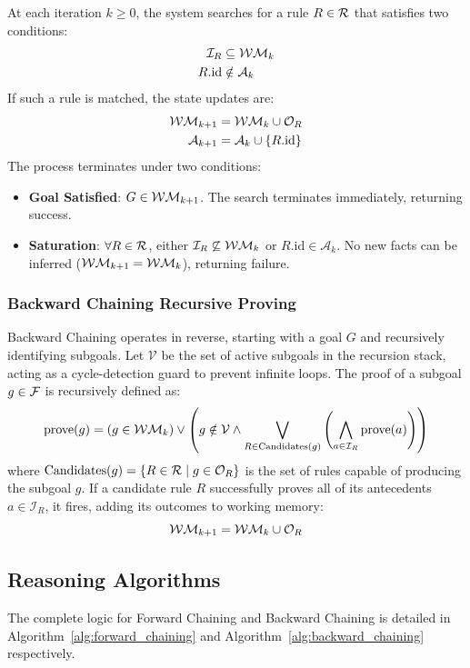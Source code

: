 At each iteration $k \ge 0$, the system searches for a rule $R \in \mathcal{R}$ that satisfies two conditions:
\begin{align}
    \mathcal{I}_R &\subseteq \mathcal{WM}_k \\
    R.\text{id} &\notin \mathcal{A}_k
\end{align}
If such a rule is matched, the state updates are:
\begin{align}
    \mathcal{WM}_{k+1} &= \mathcal{WM}_k \cup \mathcal{O}_R \\
    \mathcal{A}_{k+1} &= \mathcal{A}_k \cup \{ R.\text{id} \}
\end{align}
The process terminates under two conditions:
\begin{itemize}
    \item \textbf{Goal Satisfied}: $G \in \mathcal{WM}_{k+1}$. The search terminates immediately, returning success.
    \item \textbf{Saturation}: $\forall R \in \mathcal{R}$, either $\mathcal{I}_R \not\subseteq \mathcal{WM}_k$ or $R.\text{id} \in \mathcal{A}_k$. No new facts can be inferred ($\mathcal{WM}_{k+1} = \mathcal{WM}_k$), returning failure.
\end{itemize}

\subsubsection{Backward Chaining Recursive Proving}
Backward Chaining operates in reverse, starting with a goal $G$ and recursively identifying subgoals. Let $\mathcal{V}$ be the set of active subgoals in the recursion stack, acting as a cycle-detection guard to prevent infinite loops. The proof of a subgoal $g \in \mathcal{F}$ is recursively defined as:
\begin{equation}
    \text{prove}(g) = (g \in \mathcal{WM}_k) \lor \left( g \notin \mathcal{V} \land \bigvee_{R \in \text{Candidates}(g)} \left( \bigwedge_{a \in \mathcal{I}_R} \text{prove}(a) \right) \right)
\end{equation}
where $\text{Candidates}(g) = \{ R \in \mathcal{R} \mid g \in \mathcal{O}_R \}$ is the set of rules capable of producing the subgoal $g$. If a candidate rule $R$ successfully proves all of its antecedents $a \in \mathcal{I}_R$, it fires, adding its outcomes to working memory:
\begin{equation}
    \mathcal{WM}_{k+1} = \mathcal{WM}_k \cup \mathcal{O}_R
\end{equation}

\subsection{Reasoning Algorithms}
The complete logic for Forward Chaining and Backward Chaining is detailed in Algorithm~\ref{alg:forward_chaining} and Algorithm~\ref{alg:backward_chaining} respectively.

